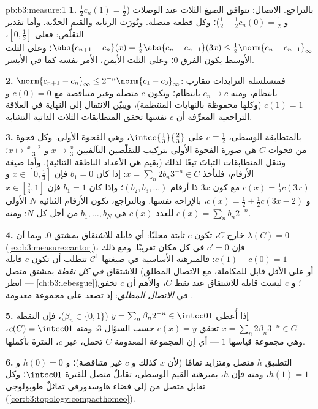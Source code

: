 \begin{solution}{pb:b3:measure:1}
\textbf{1.} بالتراجع. الاتصال: تتوافق الصيغ الثلاث عند الوصلات
($\frac12c_n(1) = \frac12$ و $\frac12 +
\frac12c_n(0) = \frac12$)؛ وكل قطعة متصلة. وتُورَث الرتابة والقيم
الحدّية. وأما تقدير التقلّص: فعلى $[0,\frac13]$، $\abs{c_{n+1} - c_n}(x)
= \frac12\abs{c_n - c_{n-1}}(3x) \leq \frac12\norm{c_n -
c_{n-1}}_\infty$؛ وعلى
الثلث الأوسط يكون الفرق $0$؛ وعلى الثلث الأيمن، الأمر نفسه كما
في الأيسر.

\textbf{2.} $\norm{c_{n+1} - c_n}_\infty \leq
2^{-n}\norm{c_1 - c_0}_\infty$: فمتسلسلة التزايدات تتقارب بانتظام، ومنه
$c_n \to c$ بانتظام؛ وتكون $c$ متصلة وغير متناقصة مع $c(0) = 0$
و $c(1) = 1$ (وكلها محفوظة بالنهايات المنتظمة)، ويبيّن الانتقال
إلى النهاية في العلاقة التراجعية المعرِّفة أن $c$ نفسها تحقق
المتطابقات الثلاث الذاتية التشابه.

\textbf{3.} بالمتطابقة الوسطى، $c \equiv \frac12$ على $\intcc{\frac13}{\frac23}$، وهي الفجوة
الأولى. وكل فجوة من فجوات $C$ هي صورة الفجوة الأولى بتركيب
للتقلّصين التآلفيين $x \mapsto \frac x3$ و $x\mapsto\frac{x +
2}3$؛ وتنقل المتطابقات
الثباتَ تبعًا لذلك (بقيم هي الأعداد الناطقة الثنائية). وأما صيغة
الأرقام، فلنأخذ $x =
\sum_n 2b_n3^{-n} \in C$: إذا كان $b_1 = 0$ فإن $x \in
[0,\frac13]$ و $c(x) = \frac12c(3x)$
مع كون $3x$ ذا أرقام $(b_2, b_3, \dots)$؛ وإذا كان $b_1 = 1$ فإن $x \in [\frac23, 1]$
و $c(x) = \frac12 + \frac12c(3x - 2)$، بالإزاحة نفسها. وبالتراجع، تكون الأرقام الثنائية $N$
الأولى للعدد $c(x)$ هي $b_1,
\dots, b_N$ من أجل كل $N$: ومنه $c(x) = \sum_nb_n2^{-n}$.

\textbf{4.} خارج $C$، تكون $c$ ثابتة محليًا: أي قابلة للاشتقاق
بمشتق $0$. وبما أن $\lambda(C) = 0$ (\cref{ex:b3:measure:cantor})، فإن $c' = 0$
في كل مكان تقريبًا. ومع ذلك $c(1) - c(0) = 1$: فالمبرهنة الأساسية في
صيغتها $\mathcal
C^1$ تتطلب أن تكون $c$ قابلة للاشتقاق \emph{في كل
نقطة} بمشتق متصل (أو على الأقل قابل للمكاملة، مع الاتصال المطلق
--- انظر \cref{ch:b3:lebesgue})؛ و $c$ ليست قابلة للاشتقاق عند نقط $C$،
والأهم أن $c$ تخفق في \emph{الاتصال المطلق}: إذ تصعد على مجموعة
معدومة .

\textbf{5.} إذا أُعطي $y = \sum_n\beta_n2^{-n} \in \intcc01$ ($\beta_n \in \{0,1\}$)، فإن النقطة $x = \sum_n2\beta_n3^{-n}
\in C$ تحقق
$c(x) = y$ حسب السؤال 3: ومنه $c(C) = \intcc01$، وهي مجموعة قياسها $1$
--- أي إن المجموعة المعدومة  $C$ تحمل، عبر $c$، الفترةَ
بأكملها.

\textbf{6.} التطبيق $h$ متصل ومتزايد تمامًا (لأن $x$ كذلك و $c$
غير متناقصة)؛ و $h(0) = 0$ و $h(1) = 1$، ومنه فإن $h$، بمبرهنة
القيم الوسطى، تقابلٌ متصل للفترة $\intcc01$؛ وكل تقابل متصل من
 إلى فضاء هاوسدورفي تماثلٌ طوبولوجي (\cref{cor:b3:topology:compacthomeo}).


\end{solution}
